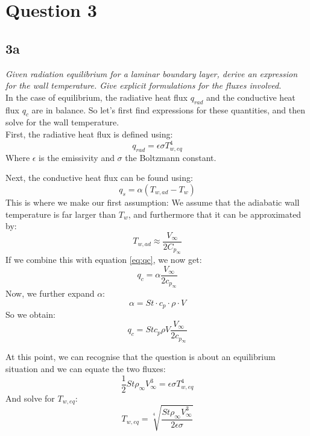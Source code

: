 \section{Question 3}\label{sec:q3}    
\subsection{3a}
\textit{Given radiation equilibrium for a laminar boundary layer, derive an expression for the wall temperature. Give explicit formulations for the fluxes involved.}\\
In the case of equilibrium, the radiative heat flux $q_{rad}$ and the conductive heat flux $q_c$ are in balance. So let's first find expressions for these quantities, and then solve for the wall temperature.\\ 
First, the radiative heat flux is defined using:
\begin{equation}\label{eq:qrad}
    q_{rad} = \epsilon \sigma T_{w,eq}^4
\end{equation}
Where $\epsilon$ is the emissivity and $\sigma$ the Boltzmann constant.

Next, the conductive heat flux can be found using:
\begin{equation}\label{eq:qc}
    q_{s} = \alpha (T_{w,ad} - T_w)
\end{equation}
This is where we make our first assumption: We assume that the adiabatic wall temperature is far larger than $T_w$, and furthermore that it can be approximated by:
\begin{equation}
    T_{w,ad} \approx \frac{V_\infty}{2C_{p_\infty}}
\end{equation}
If we combine this with equation \ref{eq:qc}, we now get:
\begin{equation}
    q_c = \alpha \frac{V_\infty}{2c_{p_\infty}}
\end{equation}
Now, we further expand $\alpha$:
\begin{equation}
    \alpha = St \cdot c_p \cdot \rho \cdot V
\end{equation}
So we obtain:
\begin{equation}
    q_c = St c_p \rho V \frac{V_\infty}{2c_{p_\infty}}
\end{equation}

At this point, we can recognise that the question is about an equilibrium situation and we can equate the two fluxes:
\begin{equation}
    \frac{1}{2} St \rho_\infty V_\infty^3  = \epsilon \sigma T_{w,eq}^4
\end{equation}
And solve for $T_{w,eq}$:
\begin{equation}
    T_{w,eq} = \sqrt[4]{\frac{St \rho_\infty V_\infty^3}{2 \epsilon \sigma}}   
\end{equation}

